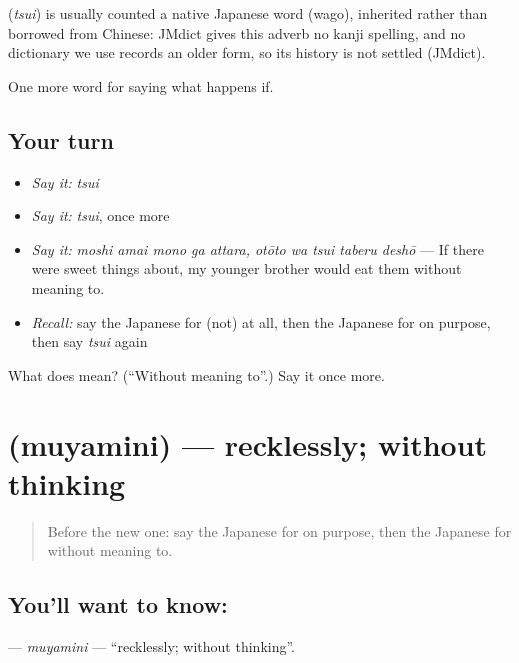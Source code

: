 \begin{cousinweb}
\textbf{} (\emph{tsui}) is usually counted a native Japanese word (wago), inherited rather than borrowed from Chinese: JMdict gives this adverb no kanji spelling, and no dictionary we use records an older form, so its history is not settled (JMdict).
\end{cousinweb}

\begin{grammarlens}[title={What you've built}]
One more word for saying what happens if.
\end{grammarlens}

\subsection*{Your turn}
\begin{itemize}
\raggedright
  \item \emph{Say it:} \emph{tsui}
  \item \emph{Say it:} \emph{tsui}, once more
  \item \emph{Say it:} \emph{moshi amai mono ga attara, otōto wa tsui taberu deshō} — If there were sweet things about, my younger brother would eat them without meaning to.
  \item \emph{Recall:} say the Japanese for (not) at all, then the Japanese for on purpose, then say \emph{tsui} again
\end{itemize}

\begin{tcolorbox}[breakable,colback=teal!4,colframe=teal!35!black,title={Before you move on}]
What does  mean? (\textquotedblleft{}Without meaning to\textquotedblright{}.) Say it once more.
\end{tcolorbox}
\section[\texorpdfstring{\ja{むやみに} (muyamini)}{むやみに (muyamini)}]{ (muyamini) — recklessly; without thinking}

\label{lesson:JA-C531-muyamini}



\begin{quote}
Before the new one: say the Japanese for on purpose, then the Japanese for without meaning to.
\end{quote}

\subsection*{You'll want to know: }
\textbf{} — \emph{muyamini} — \textquotedblleft{}recklessly; without thinking\textquotedblright{}.

